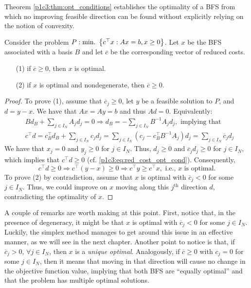 
Theorem \ref{p1c3:thm:opt_conditions} establishes the optimality of a BFS from which no improving feasible direction can be found without explicitly relying on the notion of convexity.

\begin{theorem}\label{p1c3:thm:opt_conditions}
	Consider the problem $P : \mathop{\text{min.~}}\left\{ c^\top x : Ax = b, x \geq 0 \right \}$. Let $x$ be the BFS associated with a basis $B$ and let $\overline{c}$ be the corresponding vector of reduced costs.
	\begin{enumerate}
		\item[(1)] if $\overline{c} \geq 0$, then $x$ is optimal.
		\item[(2)] if $x$ is optimal and nondegenerate, then $\overline{c} \geq 0$.	
	\end{enumerate}
\end{theorem}

\begin{proof}
To prove (1), assume that $\overline{c}_j \geq 0$, let $y$ be a feasible solution to $P$, and $d = y - x$. We have that $Ax = Ay = b$ and thus $Ad = 0$. Equivalently:
%
\begin{align}
	&B d_B + \sum_{j \in I_N}A_j d_j = 0 \Rightarrow d_B = - \sum_{j \in I_N}B^{-1}A_jd_j, \text{ implying that } \nonumber \\
	&c^\top d = c_B^\top d_B + \sum_{j \in I_N}c_jd_j= \sum_{j \in I_N} (c_j - c_B^\top B^{-1}A_j)d_j = \sum_{j \in I_N}\overline{c}_jd_j \label{p1c3:eq:red_cost_opt_cond}
\end{align}
%
We have that $x_j = 0$ and $y_j \geq 0$	for $j \in I_N$. Thus, $d_j \geq 0$ and $\overline{c}_jd_j \geq 0$ for $j \in I_N$, which implies that $c^\top d \geq 0$ (cf. \eqref{p1c3:eq:red_cost_opt_cond}). Consequently,
%
\begin{equation*}
	c^\top d \geq 0 \Rightarrow	c^\top (y - x) \geq 0 \Rightarrow c^\top y \geq c^\top x, \text{ i.e., $x$ is optimal.}
\end{equation*}
%
To prove (2) by contradiction, assume that $x$ is optimal with $\overline{c}_j < 0$ for some $j \in I_N$. Thus, we could improve on $x$ moving along this $j^\text{th}$ direction $d$, contradicting the optimality of $x$.
\end{proof}

A couple of remarks are worth making at this point. First, notice that, in the presence of degeneracy, it might be that $x$ is optimal with $\overline{c}_j < 0$ for some $j \in I_N$. Luckily, the simplex method manages to get around this issue in an effective manner, as we will see in the next chapter. Another point to notice is that, if $\overline{c}_j > 0$, $\forall j \in I_N$, then $x$ is a \emph{unique optimal}. Analogously, if $\overline{c} \geq 0$ with $c_j =0$ for some $j \in I_N$, then it means that moving in that direction will cause no change in the objective function value, implying that both BFS are ``equally optimal'' and that the problem has multiple optimal solutions. 

